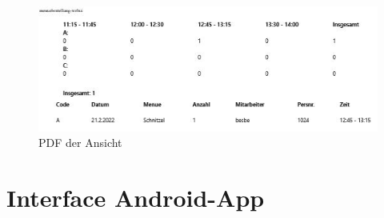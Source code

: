 \begin{figure}[htp]
    \centering
    \includegraphics[scale=1]{pics/pdf_ansicht.JPG}
    \caption{PDF der Ansicht}
    \label{fig:impl:CantinePrintPDF}
\end{figure}
\pagebreak

\section {Interface Android-App}
\author{Bozidar Spasenovic}


